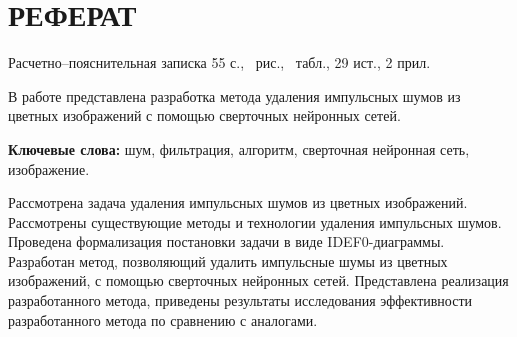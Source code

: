 \section*{РЕФЕРАТ}

Расчетно--пояснительная записка 55 с., \totalfigures\ рис., \totaltables\ табл., 29 ист., 2 прил.

В работе представлена разработка метода удаления импульсных шумов из цветных изображений с помощью сверточных
нейронных сетей.

\textbf{Ключевые слова:} шум, фильтрация, алгоритм, сверточная нейронная сеть, изображение.

Рассмотрена задача удаления импульсных шумов из цветных изображений.
Рассмотрены существующие методы и технологии удаления импульсных шумов.
Проведена формализация постановки задачи в виде IDEF0-диаграммы.
Разработан метод, позволяющий удалить импульсные шумы из цветных изображений, с помощью сверточных нейронных сетей.
Представлена реализация разработанного метода, приведены результаты исследования эффективности разработанного метода по сравнению с аналогами.